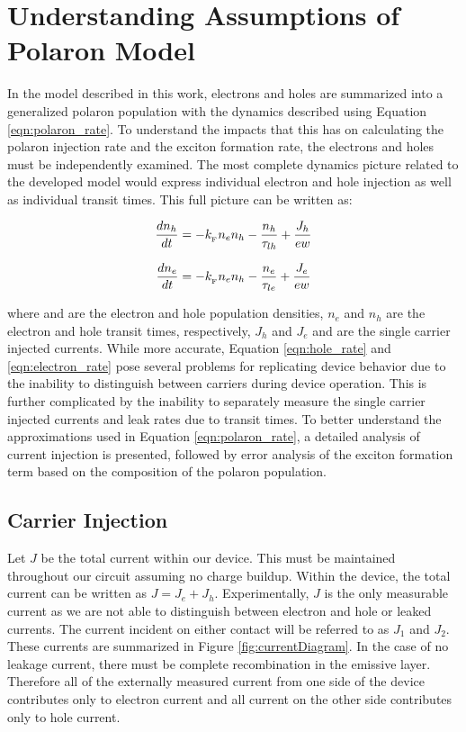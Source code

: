 \documentclass[../thesis.tex]{subfiles}
\begin{document}
\section{Understanding Assumptions of Polaron Model}


In the model described in this work, electrons and holes are summarized into a generalized
polaron population with the dynamics described using Equation \ref{eqn:polaron_rate}. 
To understand the impacts that this has on calculating the polaron injection rate and the exciton formation rate, the electrons and holes must be independently examined. 
The most complete dynamics picture related to the developed model would express individual electron and hole injection as well as individual transit times. This full picture can be written as:

\begin{equation}
\frac{dn_h}{dt}=-k_{_\text{\tiny F}} n_en_h-\frac{n_h}{\tau_{lh}}+\frac{J_h}{ew}
\label{eqn:hole_rate}
\end{equation}

\begin{equation}
\frac{dn_e}{dt}=-k_{_\text{\tiny F}} n_en_h-\frac{n_e}{\tau_{le}}+\frac{J_e}{ew}
\label{eqn:electron_rate}
\end{equation}


where and are the electron and hole population densities, $n_e$ and $n_h$ are the electron and hole
transit times, respectively, $J_h$ and $J_e$ and are the single carrier injected currents. While more
accurate, Equation \ref{eqn:hole_rate} and \ref{eqn:electron_rate} pose several problems for replicating device behavior due to the inability to distinguish between carriers during device operation. 
This is further complicated by the inability to separately measure the single carrier injected currents and leak rates due to transit times. 
To better understand the approximations used in Equation \ref{eqn:polaron_rate}, a detailed analysis of current injection is presented, followed by error analysis of the exciton formation term based on the composition of the polaron population.

\subsection{Carrier Injection} \label{sec:carrier_injection}


Let $J$ be the total current within our device.  
This must be maintained throughout our circuit assuming no charge buildup. 
Within the device, the total current can be written as $J=J_e+J_h$.  
Experimentally, $J$ is the only measurable current as we are not able to distinguish between electron and hole or leaked currents.  
The current incident on either contact will be referred to as  $J_1$ and $J_2$. 
These currents are summarized in Figure \ref{fig:currentDiagram}.
In the case of no leakage current, there must be complete recombination in the emissive layer.  
Therefore all of the externally measured current from one side of the device contributes only to electron current and all current on the other side contributes only to hole current.
\end{document}
